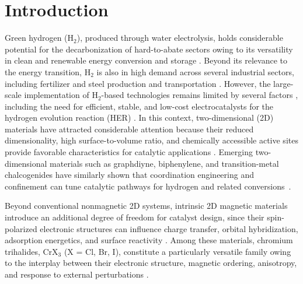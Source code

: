 \documentclass[journal=jacsat,manuscript=article]{achemso}
\begin{document}

\section{Introduction}

\noindent Green hydrogen (H$_2$), produced through water electrolysis, holds considerable potential for the decarbonization of hard-to-abate sectors owing to its versatility in clean and renewable energy conversion and storage \cite{ZAINAL2024113941, SAKTHIMURUGAN2025104849}. Beyond its relevance to the energy transition, H$_2$ is also in high demand across several industrial sectors, including fertilizer and steel production and transportation \cite{pr12020315, ROPER2025687}. However, the large-scale implementation of H$_2$-based technologies remains limited by several factors \cite{SAKTHIMURUGAN2025104849, Odenweller2025}, including the need for efficient, stable, and low-cost electrocatalysts for the hydrogen evolution reaction (HER) \cite{Liao2022,Ipaves2025,doi:10.1021/acsaem.6c00060,doi:10.1021/acsomega.5c07529,quispe2026controllingactivitystabilitygamma}. In this context, two-dimensional (2D) materials have attracted considerable attention because their reduced dimensionality, high surface-to-volume ratio, and chemically accessible active sites provide favorable characteristics for catalytic applications \cite{doi:10.1021/acsaem.6c00060, DEYACSAPPENERMATER2026}. {\color{revcolor}%
  Emerging two-dimensional materials such as graphdiyne, biphenylene, and transition-metal chalcogenides have similarly shown that coordination engineering and confinement can tune catalytic pathways for hydrogen and related conversions~\cite{Feng2021IJHE,Feng2022IJHE,Feng2026JAC}.
}

Beyond conventional nonmagnetic 2D systems, intrinsic 2D magnetic materials introduce an additional degree of freedom for catalyst design, since their spin-polarized electronic structures can influence charge transfer, orbital hybridization, adsorption energetics, and surface reactivity \cite{Ipaves2025,doi:10.1021/acscatal.2c06319,Sun2023,Duan2021}. Among these materials, chromium trihalides, CrX$_3$ (X = Cl, Br, I), constitute a particularly versatile family owing to the interplay between their electronic structure, magnetic ordering, anisotropy, and response to external perturbations \cite{Soriano2020,Besbes2019,Lee2026,Kvashnin2020,GarridoAldea2025}.
\end{document}
